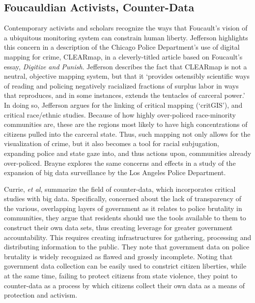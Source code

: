 \documentclass[sigconf]{acmart}
\begin{document}
\subsection{Foucauldian Activists, Counter-Data}
Contemporary activists and scholars recognize the ways that Foucault's vision of a ubiquitous monitoring system can constrain human liberty.  Jefferson highlights this concern in a description of the Chicago Police Department's use of digital mapping for crime, CLEARmap, in a cleverly-titled article based on Foucault's essay, {\em Digitize and Punish}. \cite{jefferson17} Jefferson describes the fact that CLEARmap is not a neutral, objective mapping system, but that it `provides ostensibly scientific ways of reading and policing negatively racialized fractions of surplus labor in ways that reproduces, and in some instances, extends the tentacles of carceral power.'  In doing so, Jefferson argues for the linking of critical mapping (`critGIS'), and critical race/ethnic studies.  Because of how highly over-policed race-minority communities are, these are the regions most likely to have high concentrations of citizens pulled into the carceral state. \cite{gilbert15,brunson05,brunson06,rios11,crichlow14,payne17,chaney13,schneider14,meehan02,sharp07,holmes12} Thus, such mapping not only allows for the visualization of crime, but it also becomes a tool for racial subjugation, expanding police and state gaze into, and thus actions upon, communities already over-policed.  Brayne explores the same concerns and effects in a study of the expansion of big data surveillance by the Los Angeles Police Department. \cite{brayne17}

Currie, {\em et al}, summarize the field of counter-data, which incorporates critical studies with big data. \cite{currie16} Specifically, concerned about the lack of transparency of the various, overlapping layers of government as it relates to police brutality in communities, they argue that residents should use the tools available to them to construct their own data sets, thus creating leverage for greater government accountability.  This requires creating infrastructures for gathering, processing and distributing information to the public.  They note that government data on police brutality is widely recognized as flawed and grossly incomplete. \cite{currie16,patterson16,dalton17}  Noting that government data collection can be easily used to constrict citizen liberties, while at the same time, failing to protect citizens from state violence, they point to counter-data as a process by which citizens collect their own data as a means of protection and activism.  
\end{document}
